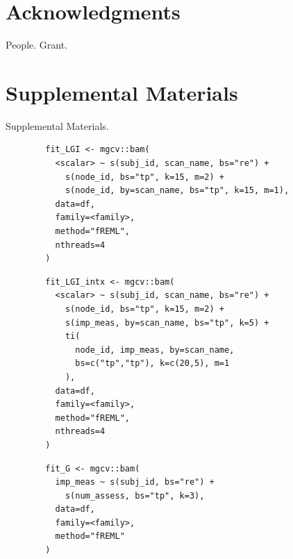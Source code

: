 \documentclass[12pt]{article}
\newcommand{\beginsupplement}{%
	\setcounter{table}{0}
	\renewcommand{\thetable}{S\arabic{table}}%
	\setcounter{figure}{0}
	\renewcommand{\thefigure}{S\arabic{figure}}%
}
\begin{document}
\section*{Acknowledgments}
\label{sec:ack}
People. Grant.



\pagebreak
\printbibliography
\pagebreak


\section{Supplemental Materials}
\label{sec:supp-materials}
\beginsupplement
Supplemental Materials.


\begin{equ}[H]
	\begin{lstlisting}
		fit_LGI <- mgcv::bam(
		  <scalar> ~ s(subj_id, scan_name, bs="re") +
		    s(node_id, bs="tp", k=15, m=2) +
		    s(node_id, by=scan_name, bs="tp", k=15, m=1),
		  data=df,
		  family=<family>,
		  method="fREML",
		  nthreads=4
		)
	\end{lstlisting}
	\caption{Tract scalars are modeled as a function of tract node with thin-plate regression splines using both global and group (\lstinline{scan_name}) smooths as well as individual group wiggliness. \lstinline{<scalar>} = relevant DWI metric (AD, RD, MD, or FA), \lstinline{scan_name} = session identifier factor (Base, Post, RTP), \lstinline{<family>} = relevant family and link function for scalar distribution.}
	\label{supp-code:gam-lgi}
\end{equ}


\begin{equ}[H]
	\begin{lstlisting}
		fit_LGI_intx <- mgcv::bam(
		  <scalar> ~ s(subj_id, scan_name, bs="re") +
		    s(node_id, bs="tp", k=15, m=2) +
		    s(imp_meas, by=scan_name, bs="tp", k=5) +
		    ti(
		      node_id, imp_meas, by=scan_name,
		      bs=c("tp","tp"), k=c(20,5), m=1
		    ),
		  data=df,
		  family=<family>,
		  method="fREML",
		  nthreads=4
		)
	\end{lstlisting}
	\caption{Tract scalars are modeled as a function of separate 1D node and ImPACT smooths as well as a 2D tensor product interaction surface. \lstinline{imp_meas} = ImPACT composite or total symptom measure.}
	\label{supp-code:gam-lgi-intx}
\end{equ}


\begin{equ}[H]
	\begin{lstlisting}
		fit_G <- mgcv::bam(
		  imp_meas ~ s(subj_id, bs="re") +
		    s(num_assess, bs="tp", k=3),
		  data=df,
		  family=<family>,
		  method="fREML"
		)
	\end{lstlisting}
	\caption{ImPACT metrics modeled as a function of number of assessments using a single global smooth. \lstinline{imp_meas} = ImPACT composite or total symptom score, \lstinline{num_assess} = assessment number (1=Base, 2=Post, 3=RTP).}
	\label{supp-code:gam-impact}
\end{equ}
\end{document}
